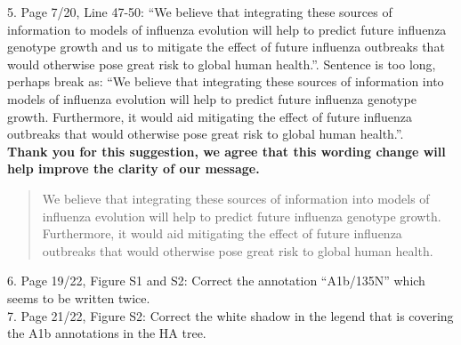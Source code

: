 \documentclass[11pt,oneside,letterpaper]{article}
\begin{document}
5. Page 7/20, Line 47-50: “We believe that integrating these sources of information to models of influenza evolution will help to predict future influenza genotype growth and us to mitigate the effect of future influenza outbreaks that would otherwise pose great risk to global human health.”. Sentence is too long, perhaps break as: “We believe that integrating these sources of information into models of influenza evolution will help to predict future influenza genotype growth. Furthermore, it would aid mitigating the effect of future influenza outbreaks that would otherwise pose great risk to global human health.”.\\

\textbf{Thank you for this suggestion, we agree that this wording change will help improve the clarity of our message.}

\begin{quotation}
  We believe that integrating these sources of information into models of influenza evolution will help to predict future influenza genotype growth.
  Furthermore, it would aid mitigating the effect of future influenza outbreaks that would otherwise pose great risk to global human health.
\end{quotation}

6. Page 19/22, Figure S1 and S2: Correct the annotation “A1b/135N” which seems to be written twice.\\

7. Page 21/22, Figure S2: Correct the white shadow in the legend that is covering the A1b annotations in the HA tree.\\


% 
\end{document}
